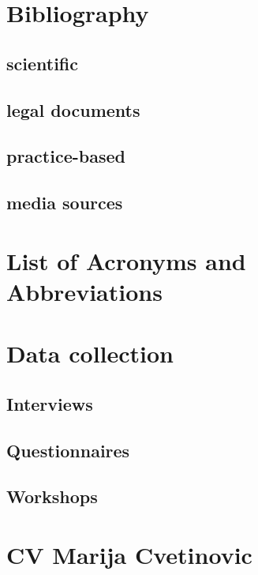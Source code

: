 \documentclass[11pt]{report}
\begin{document}
\newpage
\chapter*{Bibliography}
\section{scientific}
\section{legal documents}
\section{practice-based}
\section{media sources}

\newpage
\chapter{List of Acronyms and Abbreviations}

\newpage
\appendix
\chapter{Data collection}

\section{Interviews}
\section{Questionnaires}
\section{Workshops}

\newpage
\chapter{CV Marija Cvetinovic}



\begin{small}

\end{small}



\newpage
\appendix
\noappendicestocpagenum
\addappheadtotoc
\end{document}
